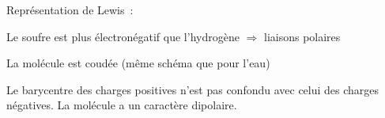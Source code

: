 Représentation de Lewis~:
\begin{center}
\end{center}

Le soufre est plus électronégatif que l'hydrogène $\Rightarrow$
liaisons  polaires

La molécule est coudée (même schéma que pour l'eau)
\begin{center}
\end{center}

Le barycentre des charges positives n'est pas confondu avec celui des charges
négatives. La molécule a un caractère dipolaire.

